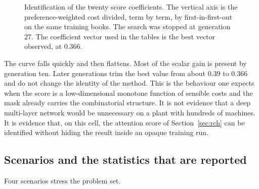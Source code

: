 \begin{figure}[ht]
\centering
{}
\caption{Identification of the twenty score coefficients. The vertical axis is the preference-weighted cost divided, term by term, by first-in-first-out on the same training books. The search was stopped at generation 27. The coefficient vector used in the tables is the best vector observed, at \(0.366\).}
\label{fig:train}
\end{figure}

The curve falls quickly and then flattens. Most of the scalar gain is present by generation ten. Later generations trim the best value from about \(0.39\) to \(0.366\) and do not change the identity of the method. This is the behaviour one expects when the score is a low-dimensional monotone function of sensible costs and the mask already carries the combinatorial structure. It is not evidence that a deep multi-layer network would be unnecessary on a plant with hundreds of machines. It is evidence that, on this cell, the attention score of Section~\ref{sec:rch} can be identified without hiding the result inside an opaque training run.

\subsection{Scenarios and the statistics that are reported}

Four scenarios stress the problem set.

